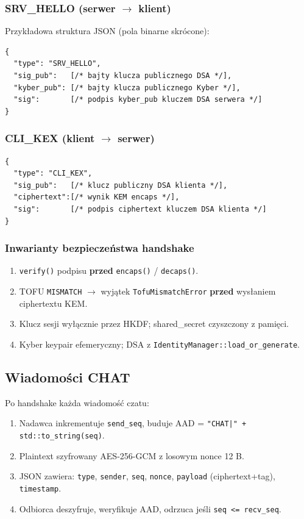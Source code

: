 \documentclass[12pt,a4paper]{article}
\begin{document}
\subsubsection{SRV\_HELLO (serwer $\rightarrow$ klient)}

Przykładowa struktura JSON (pola binarne skrócone):

\begin{lstlisting}[style=json]
{
  "type": "SRV_HELLO",
  "sig_pub":   [/* bajty klucza publicznego DSA */],
  "kyber_pub": [/* bajty klucza publicznego Kyber */],
  "sig":       [/* podpis kyber_pub kluczem DSA serwera */]
}
\end{lstlisting}

\subsubsection{CLI\_KEX (klient $\rightarrow$ serwer)}

\begin{lstlisting}[style=json]
{
  "type": "CLI_KEX",
  "sig_pub":   [/* klucz publiczny DSA klienta */],
  "ciphertext":[/* wynik KEM encaps */],
  "sig":       [/* podpis ciphertext kluczem DSA klienta */]
}
\end{lstlisting}

\subsubsection{Inwarianty bezpieczeństwa handshake}

\begin{enumerate}
    \item \texttt{verify()} podpisu \textbf{przed} \texttt{encaps()} / \texttt{decaps()}.
    \item TOFU \texttt{MISMATCH} $\rightarrow$ wyjątek \texttt{TofuMismatchError} \textbf{przed} wysłaniem ciphertextu KEM.
    \item Klucz sesji wyłącznie przez HKDF; shared\_secret czyszczony z pamięci.
    \item Kyber keypair efemeryczny; DSA z \texttt{IdentityManager::load\_or\_generate}.
\end{enumerate}

\subsection{Wiadomości CHAT}

Po handshake każda wiadomość czatu:

\begin{enumerate}
    \item Nadawca inkrementuje \texttt{send\_seq}, buduje AAD = \texttt{"CHAT|" + std::to\_string(seq)}.
    \item Plaintext szyfrowany AES-256-GCM z losowym nonce 12 B.
    \item JSON zawiera: \texttt{type}, \texttt{sender}, \texttt{seq}, \texttt{nonce}, \texttt{payload} (ciphertext+tag), \texttt{timestamp}.
    \item Odbiorca deszyfruje, weryfikuje AAD, odrzuca jeśli \texttt{seq <= recv\_seq}.
\end{enumerate}
\end{document}
